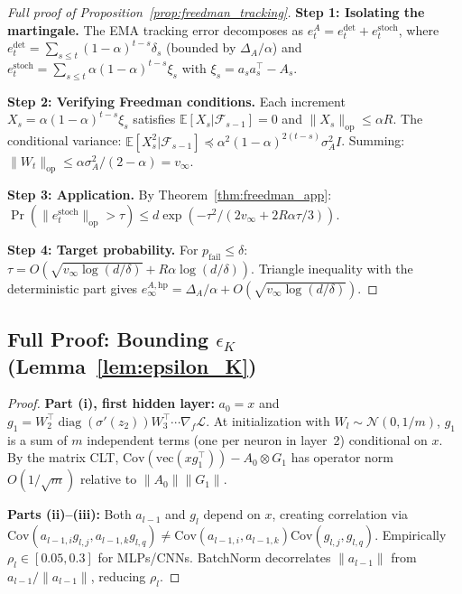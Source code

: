 \documentclass{article}
\providecommand{\E}{\mathbb{E}}
\providecommand{\norm}[1]{\lVert #1 \rVert}
\DeclareMathOperator{\diag}{diag}
\theoremstyle{plain}
\theoremstyle{definition}
\theoremstyle{remark}
\begin{document}
\begin{proof}[Full proof of Proposition~\ref{prop:freedman_tracking}]
\textbf{Step 1: Isolating the martingale.} The EMA tracking error decomposes as $e_t^A = e_t^{\mathrm{det}} + e_t^{\mathrm{stoch}}$, where $e_t^{\mathrm{det}} = \sum_{s \leq t}(1-\alpha)^{t-s}\delta_s$ (bounded by $\Delta_A/\alpha$) and $e_t^{\mathrm{stoch}} = \sum_{s \leq t}\alpha(1-\alpha)^{t-s}\xi_s$ with $\xi_s = a_s a_s^\top - A_s$.

\textbf{Step 2: Verifying Freedman conditions.} Each increment $X_s = \alpha(1-\alpha)^{t-s}\xi_s$ satisfies $\E[X_s|\mathcal{F}_{s-1}]=0$ and $\norm{X_s}_{\mathrm{op}} \leq \alpha R$. The conditional variance: $\E[X_s^2|\mathcal{F}_{s-1}] \preceq \alpha^2(1-\alpha)^{2(t-s)}\sigma_A^2 I$. Summing: $\norm{W_t}_{\mathrm{op}} \leq \alpha\sigma_A^2/(2-\alpha) = v_\infty$.

\textbf{Step 3: Application.} By Theorem~\ref{thm:freedman_app}: $\Pr(\norm{e_t^{\mathrm{stoch}}}_{\mathrm{op}} > \tau) \leq d\exp(-\tau^2/(2v_\infty + 2R\alpha\tau/3))$.

\textbf{Step 4: Target probability.} For $p_{\mathrm{fail}} \leq \delta$: $\tau = O(\sqrt{v_\infty\log(d/\delta)} + R\alpha\log(d/\delta))$. Triangle inequality with the deterministic part gives $e_\infty^{A,\mathrm{hp}} = \Delta_A/\alpha + O(\sqrt{v_\infty\log(d/\delta)})$.
\end{proof}

\subsection{Full Proof: Bounding $\epsilon_K$ (Lemma~\ref{lem:epsilon_K})}

\begin{proof}
\textbf{Part (i), first hidden layer:} $a_0 = x$ and $g_1 = W_2^\top\diag(\sigma'(z_2))W_3^\top\cdots\nabla_f\mathcal{L}$. At initialization with $W_l \sim \mathcal{N}(0,1/m)$, $g_1$ is a sum of $m$ independent terms (one per neuron in layer~2) conditional on $x$. By the matrix CLT, $\mathrm{Cov}(\mathrm{vec}(xg_1^\top)) - A_0 \otimes G_1$ has operator norm $O(1/\sqrt{m})$ relative to $\norm{A_0}\norm{G_1}$.

\textbf{Parts (ii)--(iii):} Both $a_{l-1}$ and $g_l$ depend on $x$, creating correlation via $\mathrm{Cov}(a_{l-1,i}g_{l,j}, a_{l-1,k}g_{l,q}) \neq \mathrm{Cov}(a_{l-1,i},a_{l-1,k})\mathrm{Cov}(g_{l,j},g_{l,q})$. Empirically $\rho_l \in [0.05,0.3]$ for MLPs/CNNs. BatchNorm decorrelates $\norm{a_{l-1}}$ from $a_{l-1}/\norm{a_{l-1}}$, reducing $\rho_l$.
\end{proof}
\end{document}
